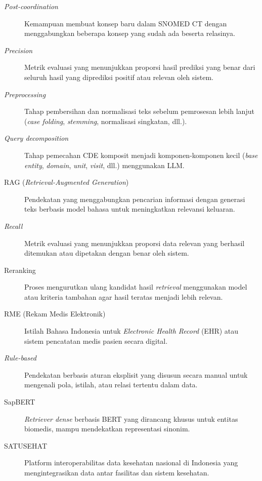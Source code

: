{\begin{description}
    \item[\textit{Post-coordination}] Kemampuan membuat konsep baru dalam SNOMED CT dengan menggabungkan beberapa konsep yang sudah ada beserta relasinya.

    \item[\textit{Precision}] Metrik evaluasi yang menunjukkan proporsi hasil prediksi yang benar dari seluruh hasil yang diprediksi positif atau relevan oleh sistem.

    \item[\textit{Preprocessing}] Tahap pembersihan dan normalisasi teks sebelum pemrosesan lebih lanjut (\textit{case folding}, \textit{stemming}, normalisasi singkatan, dll.).

    \item[\textit{Query decomposition}] Tahap pemecahan CDE komposit menjadi komponen-komponen kecil (\textit{base entity}, \textit{domain}, \textit{unit}, \textit{visit}, dll.) menggunakan LLM.

    \item[RAG (\textit{Retrieval-Augmented Generation})] Pendekatan yang menggabungkan pencarian informasi dengan generasi teks berbasis model bahasa untuk meningkatkan relevansi keluaran.

    \item[\textit{Recall}] Metrik evaluasi yang menunjukkan proporsi data relevan yang berhasil ditemukan atau dipetakan dengan benar oleh sistem.

    \item[Reranking] Proses mengurutkan ulang kandidat hasil \textit{retrieval} menggunakan model atau kriteria tambahan agar hasil teratas menjadi lebih relevan.

    \item[RME (Rekam Medis Elektronik)] Istilah Bahasa Indonesia untuk \textit{Electronic Health Record} (EHR) atau sistem pencatatan medis pasien secara digital.

    \item[\textit{Rule-based}] Pendekatan berbasis aturan eksplisit yang disusun secara manual untuk mengenali pola, istilah, atau relasi tertentu dalam data.

    \item[SapBERT] \textit{Retriever dense} berbasis BERT yang dirancang khusus untuk entitas biomedis, mampu mendekatkan representasi sinonim.

    \item[SATUSEHAT] Platform interoperabilitas data kesehatan nasional di Indonesia yang mengintegrasikan data antar fasilitas dan sistem kesehatan.


\end{description}}

